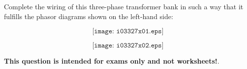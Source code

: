

Complete the wiring of this three-phase transformer bank in such a way that it fulfills the phasor diagrams shown on the left-hand side:

$$\texttt{[image: i03327x01.eps]}$$







$$\texttt{[image: i03327x02.eps]}$$







{\bf This question is intended for exams only and not worksheets!}.



